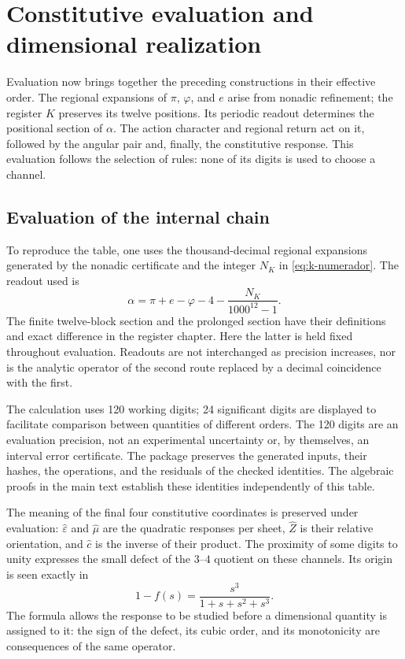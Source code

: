 \section{Constitutive evaluation and dimensional realization}
\label{iii:sec:evaluacion}

Evaluation now brings together the preceding constructions in their effective order.
The regional expansions of $\pi$, $\varphi$, and $e$ arise from nonadic
refinement; the register $K$ preserves its twelve positions. Its periodic readout
determines the positional section of $\alpha$. The action character
and regional return act on it, followed by the angular pair and, finally, the
constitutive response. This evaluation follows the selection of
rules: none of its digits is used to choose a channel.

\subsection{Evaluation of the internal chain}

To reproduce the table, one uses the thousand-decimal regional expansions
generated by the nonadic certificate and the integer $N_K$ in
\eqref{eq:k-numerador}. The readout used is
\[
 \alpha=\pi+e-\varphi-4-\frac{N_K}{1000^{12}-1}.
\]
The finite twelve-block section and the prolonged section have their
definitions and exact difference in the register chapter. Here the
latter is held fixed throughout evaluation. Readouts are not interchanged
as precision increases, nor is the analytic operator
of the second route replaced by a decimal coincidence with the first.



The calculation uses 120 working digits; 24 significant
digits are displayed to facilitate comparison between quantities of different
orders. The 120 digits are an evaluation precision, not an experimental
uncertainty or, by themselves, an interval error certificate.
The package preserves the generated inputs, their hashes, the operations, and
the residuals of the checked identities. The algebraic proofs in the
main text establish these identities independently of this table.

The meaning of the final four constitutive coordinates is preserved
under evaluation: $\widehat\varepsilon$ and $\widehat\mu$ are the quadratic
responses per sheet, $\widehat Z$ is their relative orientation, and
$\widehat c$ is the inverse of their product. The proximity of some digits to
unity expresses the small defect of the $3$--$4$ quotient on these
channels. Its origin is seen exactly in
\[
 1-f(s)=\frac{s^3}{1+s+s^2+s^3}.
\]
The formula allows the response to be studied before a dimensional
quantity is assigned to it: the sign of the defect, its cubic order, and its monotonicity
are consequences of the same operator.

